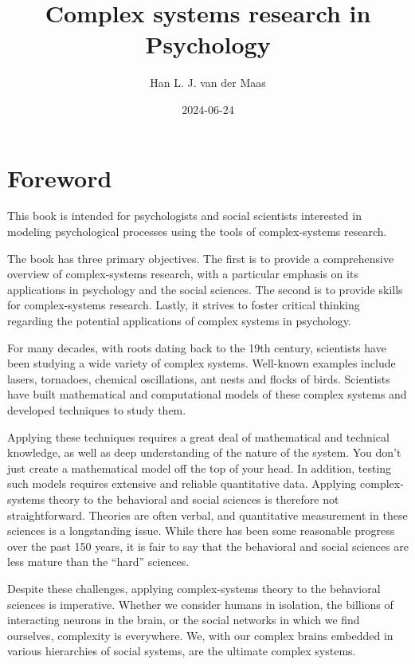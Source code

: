 \documentclass[
  a4paper,
  DIV=11,
  numbers=noendperiod,
  oneside]{scrreprt}
\title{Complex systems research in Psychology}
\author{Han L. J. van der Maas}
\date{2024-06-24}
\renewcommand*\contentsname{Table of contents}
\newcommand\contentsname{Table of contents}
\begin{document}
\maketitle

\renewcommand*\contentsname{Table of contents}
{
\hypersetup{linkcolor=}
\setcounter{tocdepth}{7}
\tableofcontents
}

\chapter*{Foreword}\label{foreword}


This book is intended for psychologists and social scientists interested
in modeling psychological processes using the tools of complex-systems
research.

The book has three primary objectives. The first is to provide a
comprehensive overview of complex-systems research, with a particular
emphasis on its applications in psychology and the social sciences. The
second is to provide skills for complex-systems research. Lastly, it
strives to foster critical thinking regarding the potential applications
of complex systems in psychology.

For many decades, with roots dating back to the 19th century, scientists
have been studying a wide variety of complex systems. Well-known
examples include lasers, tornadoes, chemical oscillations, ant nests and
flocks of birds. Scientists have built mathematical and computational
models of these complex systems and developed techniques to study them.

Applying these techniques requires a great deal of mathematical and
technical knowledge, as well as deep understanding of the nature of the
system. You don't just create a mathematical model off the top of your
head. In addition, testing such models requires extensive and reliable
quantitative data. Applying complex-systems theory to the behavioral and
social sciences is therefore not straightforward. Theories are often
verbal, and quantitative measurement in these sciences is a longstanding
issue. While there has been some reasonable progress over the past 150
years, it is fair to say that the behavioral and social sciences are
less mature than the ``hard'' sciences.

Despite these challenges, applying complex-systems theory to the
behavioral sciences is imperative. Whether we consider humans in
isolation, the billions of interacting neurons in the brain, or the
social networks in which we find ourselves, complexity is everywhere.
We, with our complex brains embedded in various hierarchies of social
systems, are the ultimate complex systems.
\end{document}
